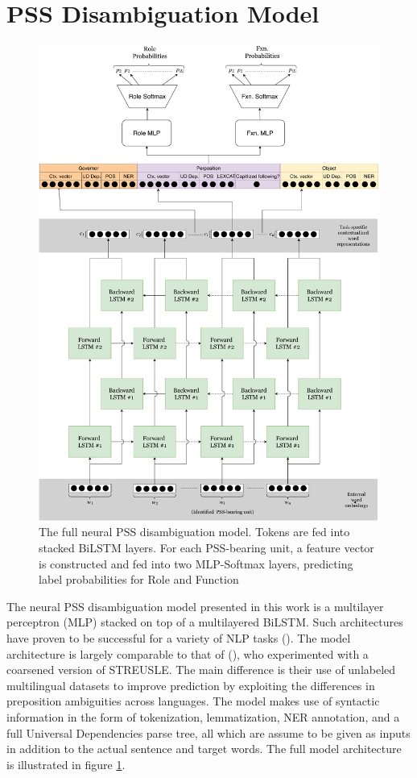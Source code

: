 \section{PSS Disambiguation Model} \label{sec:pssdisambg}

\begin{figure}
    \centering\small
    \includegraphics[width=\textwidth]{Figures/pssmodel.pdf}
    \caption{The full neural PSS disambiguation model. Tokens are fed into stacked BiLSTM layers. For each PSS-bearing unit, a feature vector is constructed and fed into two MLP-Softmax layers, predicting label probabilities for Role and Function}
    \label{fig:pssmodel}
\end{figure}

The neural PSS disambiguation model presented in this work is a multilayer perceptron (MLP) stacked on top of a multilayered BiLSTM. Such architectures have proven to be successful for a variety of NLP tasks (\cite{kiperwasser16simple, elmo}). The model architecture is largely comparable to that of (\cite{gonen16semi}), who experimented with a coarsened version of STREUSLE. The main difference is their use of unlabeled multilingual datasets to improve prediction by exploiting the differences in preposition ambiguities across languages. The model makes use of syntactic information in the form of tokenization, lemmatization, NER annotation, and a full Universal Dependencies parse tree, all which are assume to be given as inputs in addition to the actual sentence and target words.  The full model architecture is illustrated in figure \ref{fig:pssmodel}. 

